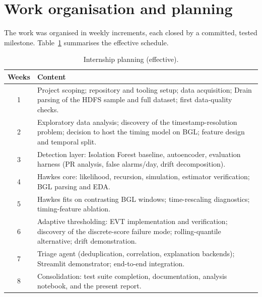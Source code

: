 \documentclass[11pt,a4paper]{report}
\begin{document}
\section{Work organisation and planning}
The work was organised in weekly increments, each closed by a committed,
tested milestone. Table~\ref{tab:planning} summarises the effective
schedule.

\begin{table}[H]
\centering
\caption{Internship planning (effective).}
\label{tab:planning}
\small
\renewcommand{\arraystretch}{1.25}
\begin{tabular}{@{}c p{11.6cm}@{}}
\toprule
\textbf{Weeks} & \textbf{Content} \\
\midrule
1 & Project scoping; repository and tooling setup; data acquisition;
Drain parsing of the HDFS sample and full dataset; first data-quality
checks. \\
2 & Exploratory data analysis; discovery of the timestamp-resolution
problem; decision to host the timing model on BGL; feature design and
temporal split. \\
3 & Detection layer: Isolation Forest baseline, autoencoder, evaluation
harness (PR analysis, false alarms/day, drift decomposition). \\
4 & Hawkes core: likelihood, recursion, simulation, estimator verification;
BGL parsing and EDA. \\
5 & Hawkes fits on contrasting BGL windows; time-rescaling diagnostics;
timing-feature ablation. \\
6 & Adaptive thresholding: EVT implementation and verification; discovery of
the discrete-score failure mode; rolling-quantile alternative; drift
demonstration. \\
7 & Triage agent (deduplication, correlation, explanation backends);
Streamlit demonstrator; end-to-end integration. \\
8 & Consolidation: test suite completion, documentation, analysis notebook,
and the present report. \\
\bottomrule
\end{tabular}
\end{table}
\end{document}
